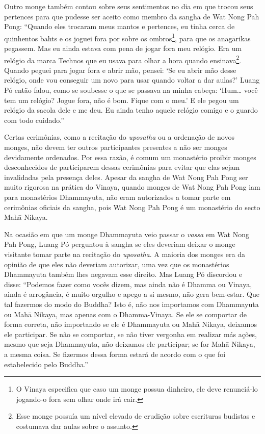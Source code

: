 Outro monge também contou sobre seus sentimentos no dia em que trocou
seus pertences para que pudesse ser aceito como membro da sangha de Wat
Nong Pah Pong: ``Quando eles trocaram meus mantos e pertences, eu tinha
cerca de quinhentos bahts e os joguei fora por sobre os ombros\footnote{O
  Vinaya especifica que caso um monge possua dinheiro, ele deve
  renunciá-lo jogando-o fora sem olhar onde irá cair.}, para que os
anagārikas pegassem. Mas eu ainda estava com pena de jogar fora meu
relógio. Era um relógio da marca Technos que eu usava para olhar a hora
quando ensinava\footnote{Esse monge possuía um nível elevado de erudição
  sobre escrituras budistas e costumava dar aulas sobre o assunto.}.
Quando peguei para jogar fora e abrir mão, pensei: `Se eu abrir mão
desse relógio, onde vou conseguir um novo para usar quando voltar a dar
aulas?' Luang Pó então falou, como se soubesse o que se passava na minha
cabeça: `Hum\ldots{} você tem um relógio? Jogue fora, não é bom. Fique
com o meu.' E ele pegou um relógio da sacola dele e me deu. Eu ainda
tenho aquele relógio comigo e o guardo com todo cuidado.''

Certas cerimônias, como a recitação do \emph{uposatha} ou a ordenação de
novos monges, não devem ter outros participantes presentes a não ser
monges devidamente ordenados. Por essa razão, é comum um monastério
proibir monges desconhecidos de participarem dessas cerimônias para
evitar que elas sejam invalidadas pela presença deles. Apesar da sangha
de Wat Nong Pah Pong ser muito rigorosa na prática do Vinaya, quando
monges de Wat Nong Pah Pong iam para monastérios Dhammayuta, não eram
autorizados a tomar parte em cerimônias oficiais da sangha, pois Wat
Nong Pah Pong é um monastério do secto Mahā Nikaya.

Na ocasião em que um monge Dhammayuta veio passar o \emph{vassa} em Wat
Nong Pah Pong, Luang Pó perguntou à sangha se eles deveriam deixar o
monge visitante tomar parte na recitação do \emph{uposatha}. A maioria
dos monges era da opinião de que eles não deveriam autorizar, uma vez
que os monastérios Dhammayuta também lhes negavam esse direito. Mas
Luang Pó discordou e disse: ``Podemos fazer como vocês dizem, mas ainda
não é Dhamma ou Vinaya, ainda é arrogância, é muito orgulho e apego a si
mesmo, não gera bem-estar. Que tal fazermos do modo do Buddha? Isto é,
não nos importamos com Dhammayuta ou Mahā Nikaya, mas apenas com o
Dhamma-Vinaya. Se ele se comportar de forma correta, não importando se
ele é Dhammayuta ou Mahā Nikaya, deixamos ele participar. Se não se
comportar, se não tiver vergonha em realizar más ações, mesmo que seja
Dhammayuta, não deixamos ele participar; se for Mahā Nikaya, a mesma
coisa. Se fizermos dessa forma estará de acordo com o que foi
estabelecido pelo Buddha.''

